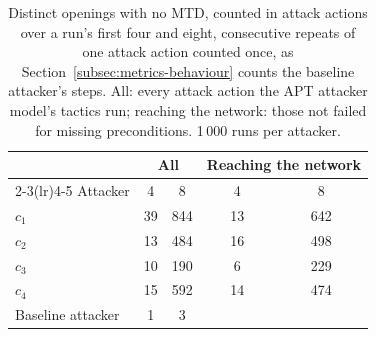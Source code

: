 
\begin{table}[htbp]
\centering
\caption[Distinct openings counted in attack actions]{Distinct openings with no MTD, counted in attack actions over a run's first four and eight, consecutive repeats of one attack action counted once, as Section~\ref{subsec:metrics-behaviour} counts the baseline attacker's steps. All: every attack action the APT attacker model's tactics run; reaching the network: those not failed for missing preconditions. 1\,000 runs per attacker.}
\label{tab:fa-openings}
\tablestyle
\begin{tabular}{@{}l c c c c@{}}
\toprule
& \multicolumn{2}{c}{All} & \multicolumn{2}{c}{Reaching the network} \\
\cmidrule(lr){2-3}\cmidrule(lr){4-5}
Attacker & 4 & 8 & 4 & 8 \\
\midrule
$c_1$ & 39 & 844 & 13 & 642 \\
$c_2$ & 13 & 484 & 16 & 498 \\
$c_3$ & 10 & 190 & 6 & 229 \\
$c_4$ & 15 & 592 & 14 & 474 \\
\midrule
Baseline attacker & 1 & 3 & & \\
\bottomrule
\end{tabular}
\end{table}

